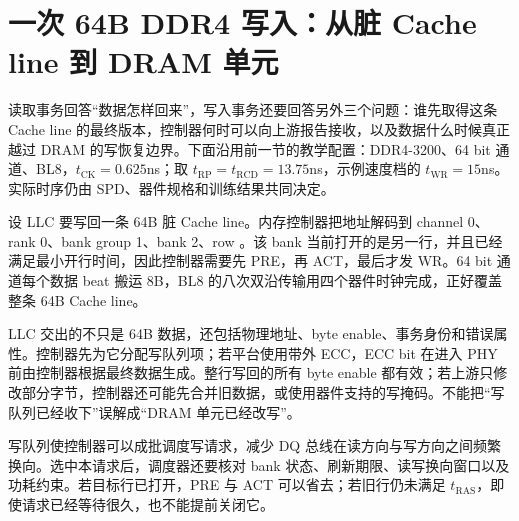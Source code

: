 \section{一次 64B DDR4 写入：从脏 Cache line 到 DRAM 单元}

读取事务回答“数据怎样回来”，写入事务还要回答另外三个问题：谁先取得这条 Cache line 的最终版本，控制器何时可以向上游报告接收，以及数据什么时候真正越过 DRAM 的写恢复边界。下面沿用前一节的教学配置：DDR4-3200、64 bit 通道、BL8，$t_{\mathrm{CK}}=0.625$ns；取 $t_{\mathrm{RP}}=t_{\mathrm{RCD}}=13.75$ns，示例速度档的 $t_{\mathrm{WR}}=15$ns。实际时序仍由 SPD、器件规格和训练结果共同决定。

设 LLC 要写回一条 64B 脏 Cache line。内存控制器把地址解码到 channel 0、rank 0、bank group 1、bank 2、row 。该 bank 当前打开的是另一行，并且已经满足最小开行时间，因此控制器需要先 PRE，再 ACT，最后才发 WR。64 bit 通道每个数据 beat 搬运 8B，BL8 的八次双沿传输用四个器件时钟完成，正好覆盖整条 64B Cache line。


LLC 交出的不只是 64B 数据，还包括物理地址、byte enable、事务身份和错误属性。控制器先为它分配写队列项；若平台使用带外 ECC，ECC bit 在进入 PHY 前由控制器根据最终数据生成。整行写回的所有 byte enable 都有效；若上游只修改部分字节，控制器还可能先合并旧数据，或使用器件支持的写掩码。不能把“写队列已经收下”误解成“DRAM 单元已经改写”。

写队列使控制器可以成批调度写请求，减少 DQ 总线在读方向与写方向之间频繁换向。选中本请求后，调度器还要核对 bank 状态、刷新期限、读写换向窗口以及功耗约束。若目标行已打开，PRE 与 ACT 可以省去；若旧行仍未满足 $t_{\mathrm{RAS}}$，即使请求已经等待很久，也不能提前关闭它。

